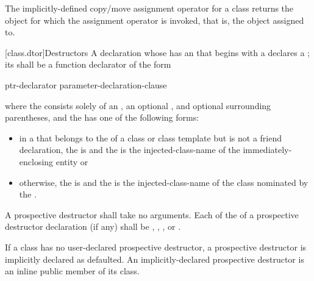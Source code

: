 \pnum
The implicitly-defined copy/move assignment operator for a class
returns the object for which the assignment operator is invoked,
that is, the object assigned to.

[class.dtor]{Destructors}%
%
%
\pnum
A declaration whose 
has an  that begins with a \tcode{\~}
declares a ;
its  shall be a function declarator of the form
\begin{ncbnf}
ptr-declarator \terminal{(} parameter-declaration-clause \terminal{)}  
\end{ncbnf}
where the  consists solely of an
, an optional ,
and optional surrounding parentheses, and the  has
one of the following forms:
\begin{itemize}
\item
in a  that belongs to the
 of a class or class template
but is not a friend
declaration, the  is
\tcode{\~} and the  is the
injected-class-name of the immediately-enclosing entity or

\item
otherwise, the
 is 
\tcode{\~} and the 
is the injected-class-name of the
class nominated by the .
\end{itemize}

A prospective destructor shall take no arguments.
Each  of the 
of a prospective destructor declaration (if any)
shall be
,
,
, or
.

\pnum
{}%
%
If a class has no user-declared
prospective destructor,
a prospective destructor is implicitly
declared as defaulted.
An implicitly-declared prospective destructor is an
inline public member of its class.

